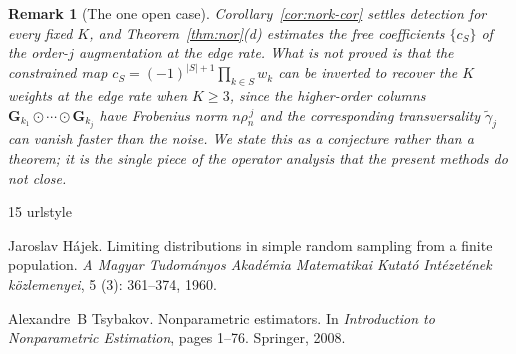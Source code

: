 \documentclass[12pt]{article}
\newtheorem{remark}{Remark}
\newcommand{\1}{\mathbf{1}}
\begin{document}
\begin{remark}[The one open case]
\label{rem:nork-conj}
Corollary~\ref{cor:nork-cor} settles detection for every fixed $K$, and Theorem~\ref{thm:nor}(d)
estimates the free coefficients $\{c_S\}$ of the order-$j$ augmentation at the edge rate. What is not
proved is that the constrained map $c_S=(-1)^{|S|+1}\prod_{k\in S}w_k$ can be inverted to recover the
$K$ weights at the edge rate when $K\ge3$, since the higher-order columns
$\mathbf G_{k_1}\odot\cdots\odot\mathbf G_{k_j}$ have Frobenius norm $n\rho_n^{\,j}$ and the
corresponding transversality $\widetilde\gamma_j$ can vanish faster than the noise. We state this as a
conjecture rather than a theorem; it is the single piece of the operator analysis that the present
methods do not close.
\end{remark}




\begin{thebibliography}{15}
\providecommand{\natexlab}[1]{#1}
\providecommand{\url}[1]{\texttt{#1}}
\expandafter\ifx\csname urlstyle\endcsname\relax
  \providecommand{\doi}[1]{doi: #1}\else
  \providecommand{\doi}{doi: \begingroup \urlstyle{rm}\Url}\fi

Jaroslav H{\'a}jek.
\newblock Limiting distributions in simple random sampling from a finite
  population.
\newblock \emph{A Magyar Tudom{\'a}nyos Akad{\'e}mia Matematikai Kutat{\'o}
  Int{\'e}zet{\'e}nek k{\"o}zlemenyei}, 5 (3): 361--374,
  1960.

Alexandre~B Tsybakov.
\newblock Nonparametric estimators.
\newblock In \emph{Introduction to Nonparametric Estimation}, pages 1--76.
  Springer, 2008.

\end{thebibliography}
\end{document}
